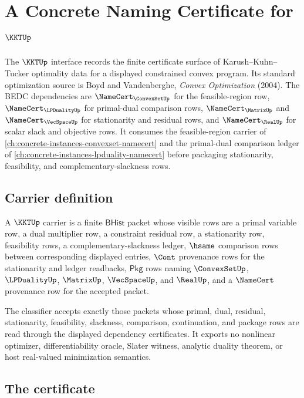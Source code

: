 \chapter{A Concrete Naming Certificate for $\KKTUp$}
\label{ch:concrete-instances-kkt-namecert}

The $\KKTUp$ interface records the finite certificate surface of Karush--Kuhn--Tucker optimality data for a displayed constrained convex program. Its standard optimization source is Boyd and Vandenberghe, \emph{Convex Optimization} (2004). The BEDC dependencies are $\NameCert_{\ConvexSetUp}$ for the feasible-region row, $\NameCert_{\LPDualityUp}$ for primal-dual comparison rows, $\NameCert_{\MatrixUp}$ and $\NameCert_{\VecSpaceUp}$ for stationarity and residual rows, and $\NameCert_{\RealUp}$ for scalar slack and objective rows. It consumes the feasible-region carrier of \autoref{ch:concrete-instances-convexset-namecert} and the primal-dual comparison ledger of \autoref{ch:concrete-instances-lpduality-namecert} before packaging stationarity, feasibility, and complementary-slackness rows.

\section{Carrier definition}
\label{sec:kkt-carrier}

\begin{definition}
\label{def:kkt-bhist-carrier}
A $\KKTUp$ carrier is a finite $\mathsf{BHist}$ packet whose visible rows are a primal variable row, a dual multiplier row, a constraint residual row, a stationarity row, feasibility rows, a complementary-slackness ledger, $\hsame$ comparison rows between corresponding displayed entries, $\Cont$ provenance rows for the stationarity and ledger readbacks, $\mathsf{Pkg}$ rows naming $\ConvexSetUp$, $\LPDualityUp$, $\MatrixUp$, $\VecSpaceUp$, and $\RealUp$, and a $\NameCert$ provenance row for the accepted packet.

The classifier accepts exactly those packets whose primal, dual, residual, stationarity, feasibility, slackness, comparison, continuation, and package rows are read through the displayed dependency certificates. It exports no nonlinear optimizer, differentiability oracle, Slater witness, analytic duality theorem, or host real-valued minimization semantics.
\end{definition}

\section{The certificate}
\label{sec:kkt-certificate}

